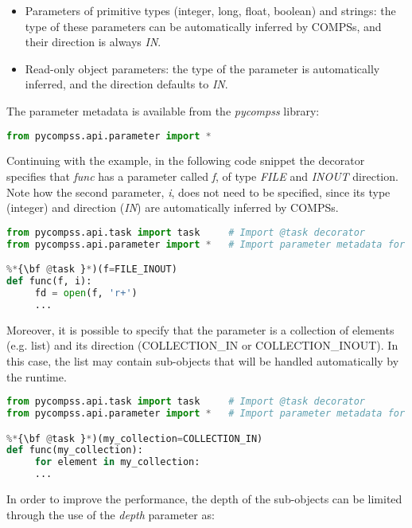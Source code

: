\begin{itemize}
 \item Parameters of primitive types (integer, long, float, boolean) and strings: the type of these 
       parameters can be automatically inferred by COMPSs, and their direction is always {\it IN}.
 \item Read-only object parameters: the type of the parameter is automatically inferred, and the 
       direction defaults to {\it IN}.
\end{itemize}

The parameter metadata is available from the {\it pycompss} library:

\begin{lstlisting}[language=python]
from pycompss.api.parameter import *
\end{lstlisting}
 
Continuing with the example, in the following code snippet the decorator specifies that {\it func} 
has a parameter called {\it f}, of type {\it FILE} and {\it INOUT} direction. Note how the second 
parameter, {\it i}, does not need to be specified, since its type (integer) and direction ({\it IN}) 
are automatically inferred by COMPSs.

\begin{lstlisting}[language=python]
from pycompss.api.task import task     # Import @task decorator
from pycompss.api.parameter import *   # Import parameter metadata for the @task decorator

%*{\bf @task }*)(f=FILE_INOUT)
def func(f, i):
     fd = open(f, 'r+')
     ...
\end{lstlisting}

Moreover, it is possible to specify that the parameter is a collection of elements (e.g. list) and its
direction (COLLECTION\_IN or COLLECTION\_INOUT). 
In this case, the list may contain sub-objects that will be handled automatically by the runtime.

\begin{lstlisting}[language=python]
from pycompss.api.task import task     # Import @task decorator
from pycompss.api.parameter import *   # Import parameter metadata for the @task decorator

%*{\bf @task }*)(my_collection=COLLECTION_IN)
def func(my_collection):
     for element in my_collection:
     ...
\end{lstlisting}
\vspace{-0.5cm}
In order to improve the performance, the depth of the sub-objects can be limited through the use of the
{\it depth} parameter as:

